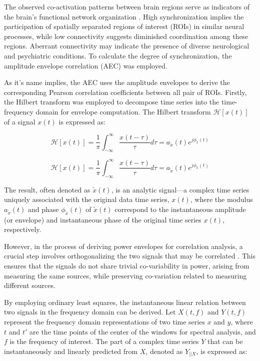 \documentclass{cys}
\begin{document}
\bigskip
The observed co-activation patterns between brain regions serve as indicators of the brain's functional network organization \cite{yeo2011organization}. High synchronization implies the participation of spatially separated regions of interest (ROIs) in similar neural processes, while low connectivity suggests diminished coordination among these regions. Aberrant connectivity may indicate the presence of diverse neurological and psychiatric conditions. To calculate the degree of synchronization, the amplitude envelope correlation (AEC) \cite{bruns2000amplitude} was employed.  



\bigskip
As it's name implies, the AEC uses the amplitude envelopes to derive the corresponding Pearson correlation coefficients between all pair of ROIs. Firstly, the Hilbert transform \cite{cohen2014analyzing} was employed to decompose time series into the time-frequency domain for envelope computation. The Hilbert transform $\mathcal{H}[x(t)]$ of a signal $x(t)$ is expressed as:

\begin{equation}
\mathcal{H}[x(t)]=\frac{1}{\pi}\int_{-\infty}^{\infty}\frac{x(t-\tau)}{\tau}d\tau=a_{\tilde{x}}(t)e^{j\phi_{\tilde{x}}(t)}
\end{equation}

\begin{equation}
\mathcal{H}[x(t)]=\frac{1}{\pi}\int_{-\infty}^{\infty}\frac{x(t-\tau)}{\tau}d\tau=a_{\tilde{x}}(t)e^{j\phi_{\tilde{x}}(t)} 
\end{equation}

The result, often denoted as $\tilde{x}(t)$, is an analytic signal—a complex time series uniquely associated with the original data time series, $x(t)$, where the modulus $a_{\tilde{x}}(t)$ and phase $\phi_{\tilde{x}}(t)$ of $\tilde{x}(t)$ correspond to the instantaneous amplitude (or envelope) and instantaneous phase of the original time series $x(t)$, respectively.

\bigskip
However, in the process of deriving power envelopes for correlation analysis, a crucial step involves orthogonalizing the two signals that may be correlated \cite{hipp2012large}. This ensures that the signals do not share trivial co-variability in power, arising from measuring the same sources, while preserving co-variation related to measuring different sources.

\bigskip
By employing ordinary least squares, the instantaneous linear relation between two signals in the frequency domain can be derived. Let $X(t,f)$ and $Y(t,f)$ represent the frequency domain representations of two time series $x$ and $y$, where $t$ and $t'$ are the time points of the center of the windows for spectral analysis, and $f$ is the frequency of interest. The part of a complex time series $Y$ that can be instantaneously and linearly predicted from $X$, denoted as $Y_{||X}$, is expressed as:
\small
\end{document}
